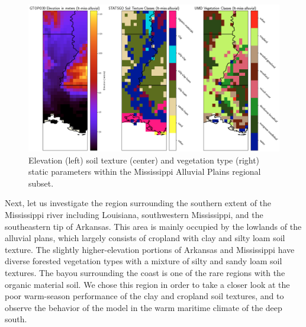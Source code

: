 \begin{figure}[h!]
    \centering

    \includegraphics[width=.99\linewidth,draft=false]{figures/lt-static/static_all-3_miss-alluvial.png}

    \caption{Elevation (left) soil texture (center) and vegetation type (right) static parameters within the Mississippi Alluvial Plains regional subset.}
    \label{lt_static_miss-alluvial}
\end{figure}

Next, let us investigate the region surrounding the southern extent of the Mississippi river including Louisiana, southwestern Mississippi, and the southeastern tip of Arkansas. This area is mainly occupied by the lowlands of the alluvial plans, which largely consists of cropland with clay and silty loam soil texture. The slightly higher-elevation portions of Arkansas and Mississippi have diverse forested vegetation types with a mixture of silty and sandy loam soil textures. The bayou surrounding the coast is one of the rare regions with the organic material soil. We chose this region in order to take a closer look at the poor warm-season performance of the clay and cropland soil textures, and to observe the behavior of the model in the warm maritime climate of the deep south.

